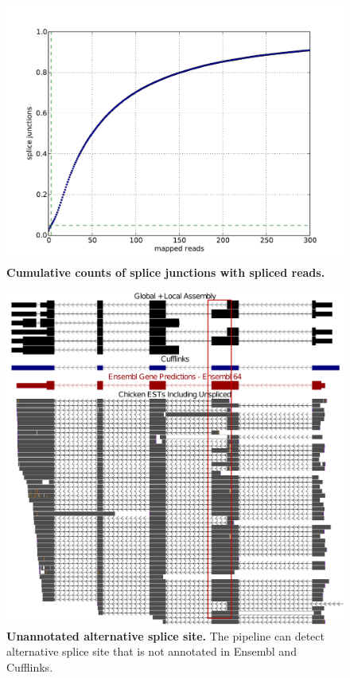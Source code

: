\documentclass[10pt]{article}
\begin{document}
\begin{figure}[!ht]
\begin{center}
\includegraphics[width=5in]{cdf_single_splice.pdf}
\end{center}
\caption{
{\bf Cumulative counts of splice junctions with spliced reads.}
}
\label{cdf_single_splice}
\end{figure}

\begin{figure}[!ht]
\begin{center}
\includegraphics[width=7in]{alt_splice_site.pdf}
\end{center}
\caption{
{\bf Unannotated alternative splice site.}
The pipeline can detect alternative splice site that is not annotated in Ensembl and Cufflinks.
}
\label{alt_splice_site}
\end{figure}
\end{document}
